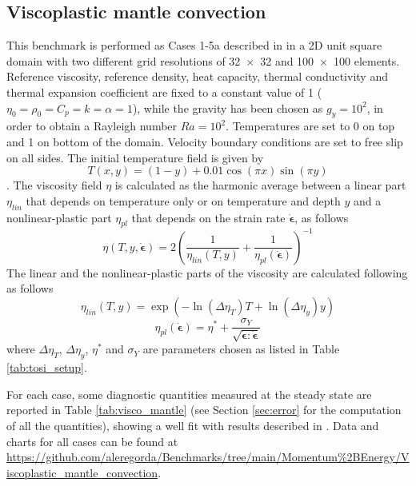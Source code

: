 \documentclass[hidelinks,10pt,a4paper]{article}
\begin{document}
\subsection{Viscoplastic mantle convection}\label{sec:visco_mantle}
This benchmark is performed as Cases 1-5a described in \citet{Tosi2015} in a 2D unit square domain with two different grid resolutions of \num{32x32} 
and \num{100x100} elements. Reference viscosity, reference density, heat capacity, thermal conductivity and thermal expansion coefficient are fixed to a constant
value of 1 ($\eta_0= \rho_0= C_p = k=\alpha=1$), while the gravity has been chosen as $g_y=10^2$, in order to obtain a Rayleigh number $Ra=10^2$. Temperatures
are set to 0 on top and 1 on bottom of the domain. Velocity boundary conditions are set to free slip on all sides. The initial temperature field is given by
\[T(x,y)=(1-y)+0.01 \cos (\pi x) \sin (\pi y)\].
The viscosity ﬁeld $\eta$ is calculated as the harmonic average between a linear part $\eta_{lin}$ that depends on temperature only or on temperature and 
depth $y$ and a nonlinear-plastic part $\eta_{pl}$ that depends on the strain rate $\dot{\bm{\epsilon}}$, as follows
\[\eta(T,y,\dot{\bm{\epsilon}})=2\left(\frac{1}{\eta_{lin}(T,y)}+\frac{1}{\eta_{pl}(\dot{\bm{\epsilon}})}\right)^{-1}\]
The linear and the nonlinear-plastic parts of the viscosity are calculated following \citet{Tosi2015} as follows
\[\eta_{lin}(T,y)=\exp(-\ln(\Delta\eta_T)T+\ln(\Delta\eta_y)y)\]
\[\eta_{pl}(\dot{\bm{\epsilon}})=\eta^*+\frac{\sigma_Y}{\sqrt{\dot{\bm{\epsilon}}:\dot{\bm{\epsilon}}}}\]
where $\Delta\eta_T$, $\Delta\eta_y$, $\eta^*$ and $\sigma_Y$ are parameters chosen as listed in Table \ref{tab:tosi_setup}.

For each case, some diagnostic quantities measured at the steady state are reported in Table \ref{tab:visco_mantle} (see Section \ref{sec:error} for 
the computation of all the quantities), showing a well fit with results described in \citet{Tosi2015}. Data and charts for all cases can be found at 
\url{https://github.com/aleregorda/Benchmarks/tree/main/Momentum%2BEnergy/Viscoplastic_mantle_convection}.
\end{document}
